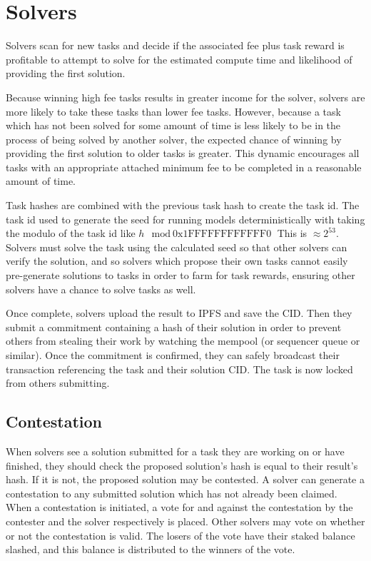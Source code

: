 \documentclass{article}
\begin{document}
\section{Solvers}

Solvers scan for new tasks and decide if the associated fee plus task reward is profitable to attempt to solve for the estimated compute time and likelihood of providing the first solution.

Because winning high fee tasks results in greater income for the solver, solvers are more likely to take these tasks than lower fee tasks. However, because a task which has not been solved for some amount of time is less likely to be in the process of being solved by another solver, the expected chance of winning by providing the first solution to older tasks is greater. This dynamic encourages all tasks with an appropriate attached minimum fee to be completed in a reasonable amount of time.

Task hashes are combined with the previous task hash to create the task id. The task id used to generate the seed for running models deterministically with taking the modulo of the task id like $ h \mod \text{0x1FFFFFFFFFFFF0} $ This is $\approx 2^{53}$. Solvers must solve the task using the calculated seed so that other solvers can verify the solution, and so solvers which propose their own tasks cannot easily pre-generate solutions to tasks in order to farm for task rewards, ensuring other solvers have a chance to solve tasks as well.

Once complete, solvers upload the result to IPFS and save the CID\@. Then they submit a commitment containing a hash of their solution in order to prevent others from stealing their work by watching the mempool (or sequencer queue or similar). Once the commitment is confirmed, they can safely broadcast their transaction referencing the task and their solution CID\@. The task is now locked from others submitting.

\subsection{Contestation}\label{contestation}


When solvers see a solution submitted for a task they are working on or have finished, they should check the proposed solution's hash is equal to their result's hash. If it is not, the proposed solution may be contested. A solver can generate a contestation to any submitted solution which has not already been claimed. When a contestation is initiated, a vote for and against the contestation by the contester and the solver respectively is placed. Other solvers may vote on whether or not the contestation is valid. The losers of the vote have their staked balance slashed, and this balance is distributed to the winners of the vote.
\end{document}
